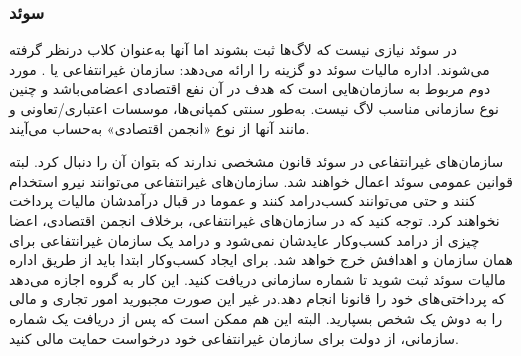 \subsubsection{سوئد}
در سوئد نیازی نیست که لاگ‌ها ثبت بشوند اما آنها به‌عنوان کلاب
درنظر گرفته می‌شوند. اداره مالیات سوئد دو گزینه را ارائه می‌دهد:
سازمان غیرانتفاعی یا
.
مورد دوم مربوط به سازمان‌هایی
است که هدف در آن نفع اقتصادی اعضامی‌باشد و چنین نوع سازمانی مناسب
لاگ نیست. به‌طور سنتی کمپانی‌ها، موسسات اعتباری/تعاونی و مانند آنها
از نوع «انجمن اقتصادی» به‌حساب می‌آیند.

سازمان‌های غیرانتفاعی در سوئد قانون مشخصی ندارند که بتوان آن را دنبال کرد.
لبته قوانین عمومی سوئد اعمال خواهند شد. سازمان‌های غیرانتفاعی می‌توانند نیرو
استخدام کنند و حتی می‌توانند کسب‌درامد کنند و عموما در قبال درآمدشان مالیات
پرداخت نخواهند کرد. توجه کنید که در سازمان‌های غیرانتفاعی، برخلاف انجمن اقتصادی،
اعضا چیزی از درامد کسب‌وکار عایدشان نمی‌شود و درامد یک سازمان غیرانتفاعی برای همان
سازمان و اهدافش خرج خواهد شد.
برای ایجاد کسب‌وکار ابتدا باید از طریق اداره مالیات سوئد ثبت شوید تا
شماره سازمانی دریافت کنید. این کار به گروه اجازه می‌دهد که پرداختی‌های خود را
قانونا انجام دهد.در غیر این صورت مجبورید امور تجاری و مالی را به دوش یک شخص
بسپارید.
البته این هم ممکن است که پس از دریافت یک شماره سازمانی، از دولت برای سازمان
غیرانتفاعی خود درخواست حمایت مالی کنید.

